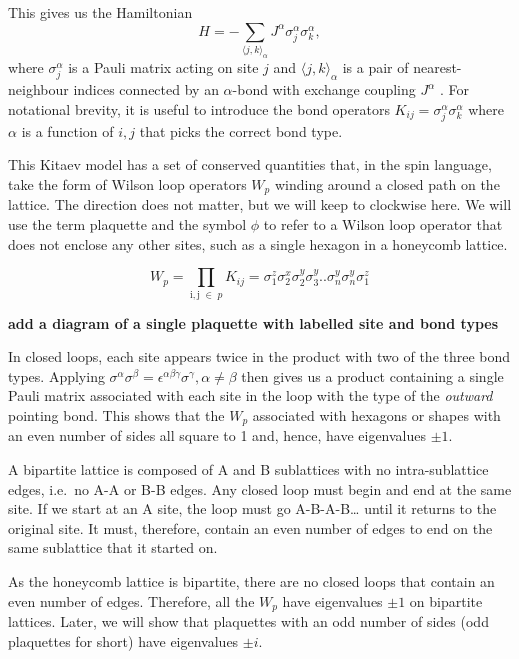 This gives us the Hamiltonian \[H =  - \sum_{\langle j,k\rangle_\alpha} J^{\alpha}\sigma_j^{\alpha}\sigma_k^{\alpha},\] where \(\sigma^\alpha_j\) is a Pauli matrix acting on site \(j\) and \(\langle j,k\rangle_\alpha\) is a pair of nearest-neighbour indices connected by an \(\alpha\)-bond with exchange coupling \(J^\alpha\) \autocite{kitaevAnyonsExactlySolved2006}. For notational brevity, it is useful to introduce the bond operators \(K_{ij} = \sigma_j^{\alpha}\sigma_k^{\alpha}\) where \(\alpha\) is a function of \(i,j\) that picks the correct bond type.

This Kitaev model has a set of conserved quantities that, in the spin language, take the form of Wilson loop operators \(W_p\) winding around a closed path on the lattice. The direction does not matter, but we will keep to clockwise here. We will use the term plaquette and the symbol \(\phi\) to refer to a Wilson loop operator that does not enclose any other sites, such as a single hexagon in a honeycomb lattice.

\[W_p = \prod_{\mathrm{i,j}\; \in\; p} K_{ij} = \sigma_1^z \sigma_2^x \sigma_2^y \sigma_3^y .. \sigma_n^y \sigma_n^y \sigma_1^z\]

\textbf{add a diagram of a single plaquette with labelled site and bond types}

In closed loops, each site appears twice in the product with two of the three bond types. Applying \(\sigma^\alpha \sigma^\beta = \epsilon^{\alpha \beta \gamma} \sigma^\gamma, \alpha \neq \beta\) then gives us a product containing a single Pauli matrix associated with each site in the loop with the type of the \emph{outward} pointing bond. This shows that the \(W_p\) associated with hexagons or shapes with an even number of sides all square to 1 and, hence, have eigenvalues \(\pm 1\).

A bipartite lattice is composed of A and B sublattices with no intra-sublattice edges, i.e.~no A-A or B-B edges. Any closed loop must begin and end at the same site. If we start at an A site, the loop must go A-B-A-B\ldots{} until it returns to the original site. It must, therefore, contain an even number of edges to end on the same sublattice that it started on.

As the honeycomb lattice is bipartite, there are no closed loops that contain an even number of edges. Therefore, all the \(W_p\) have eigenvalues \(\pm 1\) on bipartite lattices. Later, we will show that plaquettes with an odd number of sides (odd plaquettes for short) have eigenvalues \(\pm i\).

